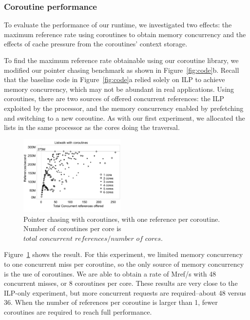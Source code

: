 \documentclass[10pt,nocopyrightspace,preprint]{sigplanconf}
\newcommand{\mrps}[1]{\unit[#1]{Mref/s}}
\begin{document}
\subsubsection{Coroutine performance}

To evaluate the performance of our runtime, we investigated two
effects: the maximum reference rate using coroutines
to obtain memory concurrency and the effects of cache pressure from the
coroutines' context storage. 

To find the maximum reference rate obtainable using our coroutine
library, we modified our pointer chasing benchmark as shown in
Figure~\ref{fig:code}b. Recall that the baseline code in Figure~\ref{fig:code}a relied solely on ILP to achieve memory concurrency, which may not be abundant in real applications. Using coroutines, there are two sources of offered
concurrent references: the ILP exploited by the processor, and the
memory concurrency enabled by prefetching and switching to a new
coroutine. As with our first experiment, we allocated the lists in the
same processor as the cores doing the traversal. 

\begin{figure}[t]
  \begin{center}
    \includegraphics[width=0.47\textwidth]{figures/multi-green-edited.pdf}
  \end{center}
  \caption{Pointer chasing with coroutines, with one reference per
    coroutine. Number of coroutines per core is $\textit{total concurrent references} / \textit{number of cores}$.}
  \label{fig:multi-green}
\end{figure}

Figure~\ref{fig:multi-green} shows the result. For this
experiment, we limited memory concurrency to one concurrent miss per
coroutine, so the only source of memory concurrency is the use of
coroutines. We are able to obtain a rate of \mrps{275} with 48 concurrent misses, or 8 coroutines per core. These
results are very close to the ILP-only experiment, but more concurrent requests are required--about 48 versus 36. When the number of references per coroutine is larger than 1, fewer coroutines are required to reach full performance.
\end{document}
